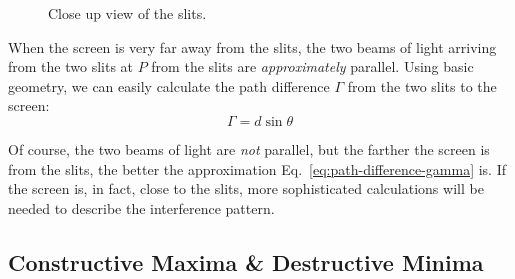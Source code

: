 \begin{figure}[ht]
  \centering
  \caption{Close up view of the slits.}
  \label{fig:close-up1}
\end{figure}
When the screen is very far away from the slits, the two beams of light
arriving from the two slits at $P$ from the slits are \emph{approximately}
parallel. Using basic geometry, we can easily calculate the path difference
$\Gamma$ from the two slits to the screen:
\begin{equation}
  \Gamma=d\sin\theta
  \label{eq:path-difference-gamma}
\end{equation}
\begin{remark}
  Of course, the two beams of light are \emph{not} parallel, but the farther
  the screen is from the slits, the better the approximation
  Eq.~\ref{eq:path-difference-gamma} is. If the screen is, in fact, close to
  the slits, more sophisticated calculations will be needed to describe the
  interference pattern.
\end{remark}



\subsection{Constructive Maxima \& Destructive Minima}

